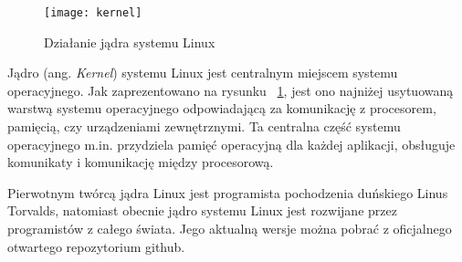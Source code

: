 \begin{figure}
\begin{center}
    \texttt{[image: kernel]}
\end{center}
\caption{Działanie jądra systemu Linux}
\label{fig:kernel}
\end{figure}

Jądro (ang. \emph{Kernel}) systemu Linux jest centralnym miejscem systemu operacyjnego. Jak zaprezentowano na rysunku ~\ref{fig:kernel}, jest ono najniżej usytuowaną warstwą systemu operacyjnego odpowiadającą za komunikację z procesorem, pamięcią, czy urządzeniami zewnętrznymi. Ta centralna część systemu operacyjnego m.in. przydziela pamięć operacyjną dla każdej aplikacji, obsługuje komunikaty i komunikację między procesorową.

Pierwotnym twórcą jądra Linux jest programista pochodzenia duńskiego Linus Torvalds, natomiast obecnie jądro systemu Linux jest rozwijane przez programistów z całego świata. Jego aktualną wersje można pobrać z oficjalnego otwartego repozytorium github.






